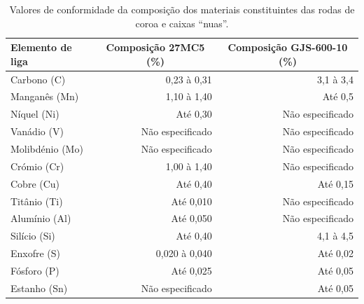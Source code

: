 \begin{table}[htb]
    \centering
    \caption[Composição dos materiais da caixa diferencial]%
    {Valores de conformidade da composição dos materiais constituintes das rodas de coroa e caixas “nuas”.}
    \label{tab:Comp_materiais}
    \begin{tabular}{lrr} 
    \toprule
    \textbf{Elemento de liga} & \multicolumn{1}{c}{\textbf{Composição 27MC5 (\%)}} & \multicolumn{1}{c}{\textbf{Composição GJS-600-10 (\%)}}  \\ 
    \hline\hline
    Carbono (C)      & 0,23 à 0,31                               & 3,1 à 3,4                                       \\
    Manganês (Mn)    & 1,10 à 1,40                               & Até 0,5                                         \\
    Níquel (Ni)      & Até 0,30                                  & Não especificado                                \\
    Vanádio (V)      & Não especificado                          & Não especificado                                \\
    Molibdénio (Mo)  & Não especificado                          & Não especificado                                \\
    Crómio (Cr)      & 1,00 à 1,40                               & Não especificado                                \\
    Cobre (Cu)       & Até 0,40                                  & Até 0,15                                        \\
    Titânio (Ti)     & Até 0,010                                 & Não especificado                                \\
    Alumínio (Al)    & Até 0,050                                 & Não especificado                                \\
    Silício (Si)     & Até 0,40                                  & 4,1 à 4,5                                       \\
    Enxofre (S)      & 0,020 à 0,040                             & Até 0,02                                        \\
    Fósforo (P)      & Até 0,025                                 & Até 0,05                                        \\
    Estanho (Sn)     & Não especificado                          & Até 0,05                                        \\
    \bottomrule
    \end{tabular}
    \end{table}
